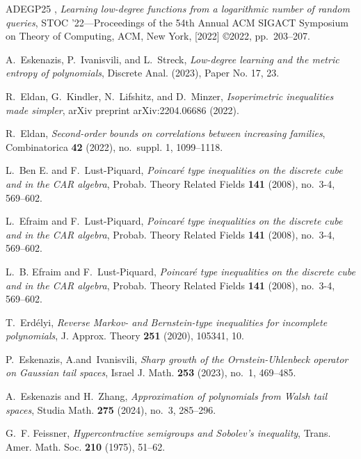 \documentclass{amsbook}
\theoremstyle{definition}
\theoremstyle{remark}
\numberwithin{section}{chapter}
\numberwithin{equation}{chapter}
\newcommand{\1}{\mathbf{1}}
\begin{document}
\begin{thebibliography}{ADEGP25}
	\bysame, \emph{Learning low-degree functions from a logarithmic number of
		random queries}, S{TOC} '22---{P}roceedings of the 54th {A}nnual {ACM}
	{SIGACT} {S}ymposium on {T}heory of {C}omputing, ACM, New York, [2022]
	\copyright 2022, pp.~203--207. 
	
	A.~Eskenazis, P.~Ivanisvili, and L.~Streck, \emph{Low-degree learning and the
		metric entropy of polynomials}, Discrete Anal. (2023), Paper No. 17, 23.
	
	R.~Eldan, G.~Kindler, N.~Lifshitz, and D.~Minzer, \emph{Isoperimetric
		inequalities made simpler}, arXiv preprint arXiv:2204.06686 (2022).
	
	R.~Eldan, \emph{Second-order bounds on correlations between increasing
		families}, Combinatorica \textbf{42} (2022), no.~suppl. 1, 1099--1118.
	
	L.~Ben E. and F.~Lust-Piquard, \emph{Poincar\'{e} type inequalities on the
		discrete cube and in the {CAR} algebra}, Probab. Theory Related Fields
	\textbf{141} (2008), no.~3-4, 569--602. 
	
	L.~Efraim and F.~Lust-Piquard, \emph{Poincar\'{e} type inequalities on the
		discrete cube and in the {CAR} algebra}, Probab. Theory Related Fields
	\textbf{141} (2008), no.~3-4, 569--602. 
	
	L.~B. Efraim and F.~Lust-Piquard, \emph{Poincar\'{e} type inequalities on the
		discrete cube and in the {CAR} algebra}, Probab. Theory Related Fields
	\textbf{141} (2008), no.~3-4, 569--602.
	
	T.~Erd\'{e}lyi, \emph{Reverse {M}arkov- and {B}ernstein-type inequalities for
		incomplete polynomials}, J. Approx. Theory \textbf{251} (2020), 105341, 10.
	
	P.~Eskenazis, A.and~Ivanisvili, \emph{Sharp growth of the
		{O}rnstein-{U}hlenbeck operator on {G}aussian tail spaces}, Israel J. Math.
	\textbf{253} (2023), no.~1, 469--485. 
	
	A.~Eskenazis and H.~Zhang, \emph{Approximation of polynomials from {W}alsh tail
		spaces}, Studia Math. \textbf{275} (2024), no.~3, 285--296. 
	
	G.~F. Feissner, \emph{Hypercontractive semigroups and {S}obolev's inequality},
	Trans. Amer. Math. Soc. \textbf{210} (1975), 51--62. 
	

\end{thebibliography}
\end{document}
